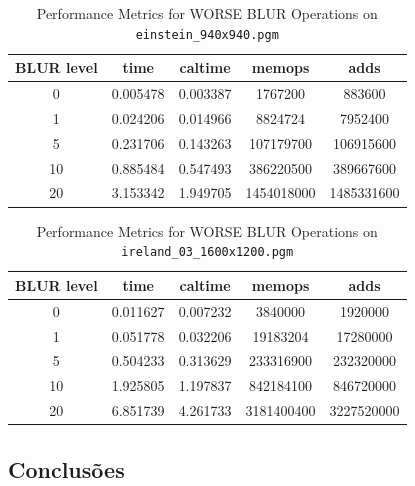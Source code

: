 \documentclass{report}
\begin{document}
\begin{table}[h]
    \centering
    \begin{tabular}{ccccc}
        \toprule
        \textbf{BLUR level} & \textbf{time} & \textbf{caltime} & \textbf{memops} & \textbf{adds} \\
        \midrule
        0 & 0.005478 & 0.003387 & 1767200 & 883600 \\
        1 & 0.024206 & 0.014966 & 8824724 & 7952400 \\
        5 & 0.231706 & 0.143263 & 107179700 & 106915600 \\
        10 & 0.885484 & 0.547493 & 386220500 & 389667600 \\
        20 & 3.153342 & 1.949705 & 1454018000 & 1485331600 \\
        \bottomrule
    \end{tabular}
    \caption*{Performance Metrics for WORSE BLUR Operations on \texttt{einstein\_940x940.pgm}}
\end{table}

\begin{table}[h]
    \centering
    \begin{tabular}{ccccc}
        \toprule
        \textbf{BLUR level} & \textbf{time} & \textbf{caltime} & \textbf{memops} & \textbf{adds} \\
        \midrule
        0 & 0.011627 & 0.007232 & 3840000 & 1920000 \\
        1 & 0.051778 & 0.032206 & 19183204 & 17280000 \\
        5 & 0.504233 & 0.313629 & 233316900 & 232320000 \\
        10 & 1.925805 & 1.197837 & 842184100 & 846720000 \\
        20 & 6.851739 & 4.261733 & 3181400400 & 3227520000 \\
        \bottomrule
    \end{tabular}
    \caption*{Performance Metrics for WORSE BLUR Operations on \texttt{ireland\_03\_1600x1200.pgm}}
\end{table}


\subsection{Conclusões}
\end{document}
